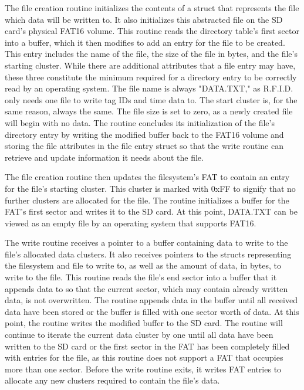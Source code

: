 The file creation routine initializes the contents of a struct that represents the file which data will be written to. It also initializes this abstracted file on the SD card's physical FAT16 volume. This routine reads the directory table's first sector into a buffer, which it then modifies to add an entry for the file to be created. This entry includes the name of the file, the size of the file in bytes, and the file's starting cluster. While there are additional attributes that a file entry may have, these three constitute the minimum required for a directory entry to be correctly read by an operating system. The file name is always "DATA.TXT," as R.F.I.D. only needs one file to write tag IDs and time data to. The start cluster is, for the same reason, always the same. The file size is set to zero, as a newly created file will begin with no data. The routine concludes its initialization of the file's directory entry by writing the modified buffer back to the FAT16 volume and storing the file attributes in the file entry struct so that the write routine can retrieve and update information it needs about the file.

The file creation routine then updates the filesystem's FAT to contain an entry for the file's starting cluster. This cluster is marked with 0xFF to signify that no further clusters are allocated for the file. The routine initializes a buffer for the FAT's first sector and writes it to the SD card. At this point, DATA.TXT can be viewed as an empty file by an operating system that supports FAT16.

The write routine receives a pointer to a buffer containing data to write to the file's allocated data clusters. It also receives pointers to the structs representing the filesystem and file to write to, as well as the amount of data, in bytes, to write to the file. This routine reads the file's end sector into a buffer that it appends data to so that the current sector, which may contain already written data, is not overwritten. The routine appends data in the buffer until all received data have been stored or the buffer is filled with one sector worth of data. At this point, the routine writes the modified buffer to the SD card. The routine will continue to iterate the current data cluster by one until all data have been written to the SD card or the first sector in the FAT has been completely filled with entries for the file, as this routine does not support a FAT that occupies more than one sector. Before the write routine exits, it writes FAT entries to allocate any new clusters required to contain the file's data. 





